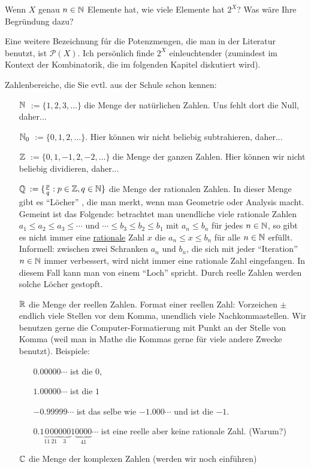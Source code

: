 \begin{aufg}
	Wenn $X$ genau $n \in \mathbb{N}$ Elemente hat, wie viele Elemente hat $2^X$? Was wäre Ihre Begründung dazu? 
\end{aufg} 

\begin{bem}
	Eine weitere Bezeichnung fúr die Potenzmengen, die man in der Literatur benutzt, ist $\mathcal{P}(X)$. Ich persönlich finde $2^X$ einleuchtender (zumindest im Kontext der Kombinatorik, die im folgenden Kapitel diskutiert wird). 
\end{bem} 


\begin{bem}
	Zahlenbereiche, die Sie evtl. aus der Schule schon kennen:
\begin{itemize}
\item[$ \mathbb{N} $] $ := \{ 1,2,3,\ldots \} $ die Menge der natürlichen Zahlen. Uns fehlt dort die Null, daher... 
\item[$ \mathbb{N}_0 $] $ := \{ 0,1,2,\ldots \} $. Hier können wir nicht beliebig subtrahieren, daher... 
\item[$ \mathbb{Z} $] $ := \{ 0,1,-1,2,-2,\ldots \} $ die Menge der ganzen Zahlen. Hier können wir nicht beliebig dividieren, daher...
\item[$ \mathbb{Q} $] $ := \{ \frac{p}{q} : p \in \mathbb{Z}, q \in \mathbb{N} \} $ die Menge der rationalen Zahlen. In dieser Menge gibt es ``Löcher'' , die man merkt, wenn man Geometrie oder Analysis macht. Gemeint ist das Folgende: betrachtet man unendliche viele rationale Zahlen $a_1 \le a_2 \le a_3 \le \cdots $ und $ \cdots \le b_3 \le b_2 \le b_1$ mit $a_n \le b_n$ für jedes $n \in \mathbb{N}$, so gibt es nicht immer eine \underline{rationale} Zahl $x$ die $a_n \le x \le b_n$ für alle $n \in \mathbb{N}$ erfüllt. Informell: zwischen zwei Schranken $a_n$ und $b_n$, die sich mit jeder ``Iteration'' $n \in \mathbb{N}$ immer verbessert, wird nicht immer eine rationale Zahl eingefangen. In diesem Fall kann man von einem ``Loch'' spricht. Durch reelle Zahlen werden solche Löcher gestopft. 
\item[$ \mathbb{R} $] die Menge der reellen Zahlen. Format einer reellen Zahl: Vorzeichen $\pm$ endlich viele Stellen vor dem Komma, unendlich viele Nachkommastellen. Wir benutzen gerne die Computer-Formatierung mit Punkt an der Stelle von Komma (weil man in Mathe die Kommas gerne für viele andere Zwecke benutzt). Beispiele: 
\begin{itemize}
	\item[] $0{.}00000\cdots$ ist die $0$, 
	\item[] $1{.}00000 \cdots$ ist die $1$ 
	\item[] $-0{.}99999 \cdots$ ist das selbe wie $-1{.}000 \cdots$ und ist die $-1$. 
	\item[] $0{.}1\underbrace{0}_11\underbrace{00}_21 \underbrace{ 000}_3 1 \underbrace{0000}_41 \cdots $ ist eine reelle aber keine rationale Zahl. (Warum?)
\end{itemize} 
	\item[$ \mathbb{C} $] die Menge der komplexen Zahlen (werden wir noch einführen) 
\end{itemize}
\end{bem}

